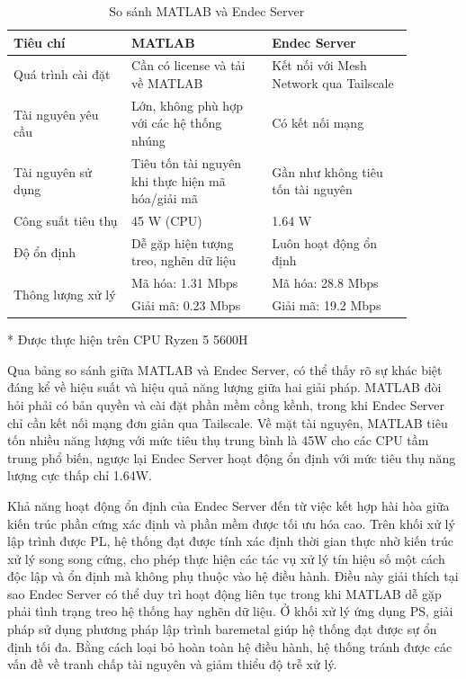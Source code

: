 \documentclass[../DoAn.tex]{subfiles}
\begin{document}
\begin{table}[H]
\centering

\begin{threeparttable}

\caption{So sánh MATLAB và Endec Server}
\begin{tabular}{|p{0.26\linewidth}|p{0.31\linewidth}|p{0.31\linewidth}|}
    \hline
    \textbf{Tiêu chí} & \textbf{MATLAB} & \textbf{Endec Server} \\ \hline\hline
    Quá trình cài đặt & Cần có license và tải về MATLAB & Kết nối với Mesh Network qua Tailscale \\ \hline 
    Tài nguyên yêu cầu & Lớn, không phù hợp với các hệ thống nhúng & Có kết nối mạng \\ \hline
    Tài nguyên sử dụng & Tiêu tốn tài nguyên khi thực hiện mã hóa/giải mã & Gần như không tiêu tốn tài nguyên \\ \hline
    Công suất tiêu thụ & 45 W (CPU)\tnote{*} & 1.64 W \\ \hline
    Độ ổn định & Dễ gặp hiện tượng treo, nghẽn dữ liệu & Luôn hoạt động ổn định \\ \hline
    \multirow{2}{*}{Thông lượng xử lý} 
      & Mã hóa: 1.31 Mbps\tnote{*} & Mã hóa: 28.8 Mbps \\ 
      & Giải mã: 0.23 Mbps\tnote{*} & Giải mã: 19.2 Mbps \\ \hline 
\end{tabular}
\begin{tablenotes}
\item[*] Được thực hiện trên CPU Ryzen 5 5600H
\end{tablenotes}

\end{threeparttable}

\label{table:So sánh MATLAB và Endec Server}
\end{table}

Qua bảng so sánh giữa MATLAB và Endec Server, có thể thấy rõ sự khác biệt đáng kể về hiệu suất và hiệu quả năng lượng giữa hai giải pháp. MATLAB đòi hỏi phải có bản quyền và cài đặt phần mềm cồng kềnh, trong khi Endec Server chỉ cần kết nối mạng đơn giản qua Tailscale. Về mặt tài nguyên, MATLAB tiêu tốn nhiều năng lượng với mức tiêu thụ trung bình là 45W cho các CPU tầm trung phổ biến, ngược lại Endec Server hoạt động ổn định với mức tiêu thụ năng lượng cực thấp chỉ 1.64W.

Khả năng hoạt động ổn định của Endec Server đến từ việc kết hợp hài hòa giữa kiến trúc phần cứng xác định và phần mềm được tối ưu hóa cao. Trên khối xử lý lập trình được PL, hệ thống đạt được tính xác định thời gian thực nhờ kiến trúc xử lý song song cứng, cho phép thực hiện các tác vụ xử lý tín hiệu số một cách độc lập và ổn định mà không phụ thuộc vào hệ điều hành. Điều này giải thích tại sao Endec Server có thể duy trì hoạt động liên tục trong khi MATLAB dễ gặp phải tình trạng treo hệ thống hay nghẽn dữ liệu. Ở khối xử lý ứng dụng PS, giải pháp sử dụng phương pháp lập trình baremetal giúp hệ thống đạt được sự ổn định tối đa. Bằng cách loại bỏ hoàn toàn hệ điều hành, hệ thống tránh được các vấn đề về tranh chấp tài nguyên và giảm thiểu độ trễ xử lý.
\end{document}
